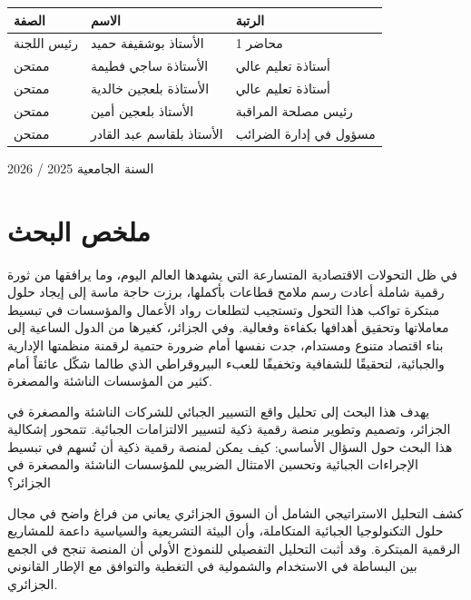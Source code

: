 \documentclass[12pt, a4paper, twoside]{report}
\begin{document}
\begin{titlepage}
\begin{center}
\begin{tabular}{|l|l|l|}
\hline
\textbf{الصفة} & \textbf{الاسم} & \textbf{الرتبة} \\
\hline
رئيس اللجنة & الأستاذ بوشقيفة حميد & محاضر 1 \\
\hline
ممتحن & الأستاذة ساجي فطيمة & أستاذة تعليم عالي \\
\hline
ممتحن & الأستاذة بلعجين خالدية & أستاذة تعليم عالي \\
\hline
ممتحن & الأستاذ بلعجين أمين & رئيس مصلحة المراقبة \\
\hline
ممتحن & الأستاذ بلقاسم عبد القادر & مسؤول في إدارة الضرائب \\
\hline
\end{tabular}

\vspace{2cm}

{\large السنة الجامعية 2025 / 2026}

\end{center}
\end{titlepage}

\chapter*{ملخص البحث}

في ظل التحولات الاقتصادية المتسارعة التي يشهدها العالم اليوم، وما يرافقها من ثورة رقمية شاملة أعادت رسم ملامح قطاعات بأكملها، برزت حاجة ماسة إلى إيجاد حلول مبتكرة تواكب هذا التحول وتستجيب لتطلعات رواد الأعمال والمؤسسات في تبسيط معاملاتها وتحقيق أهدافها بكفاءة وفعالية. وفي الجزائر، كغيرها من الدول الساعية إلى بناء اقتصاد متنوع ومستدام، جدت نفسها أمام ضرورة حتمية لرقمنة منظمتها الإدارية والجبائية، لتحقيقًا للشفافية وتخفيفًا للعبء البيروقراطي الذي طالما شكّل عائقاً أمام كثير من المؤسسات الناشئة والمصغرة.

يهدف هذا البحث إلى تحليل واقع التسيير الجبائي للشركات الناشئة والمصغرة في الجزائر، وتصميم وتطوير منصة رقمية ذكية لتسيير الالتزامات الجبائية. تتمحور إشكالية هذا البحث حول السؤال الأساسي: كيف يمكن لمنصة رقمية ذكية أن تُسهم في تبسيط الإجراءات الجبائية وتحسين الامتثال الضريبي للمؤسسات الناشئة والمصغرة في الجزائر؟

كشف التحليل الاستراتيجي الشامل أن السوق الجزائري يعاني من فراغ واضح في مجال حلول التكنولوجيا الجبائية المتكاملة، وأن البيئة التشريعية والسياسية داعمة للمشاريع الرقمية المبتكرة. وقد أثبت التحليل التفصيلي للنموذج الأولي أن المنصة تنجح في الجمع بين البساطة في الاستخدام والشمولية في التغطية والتوافق مع الإطار القانوني الجزائري.
\end{document}
